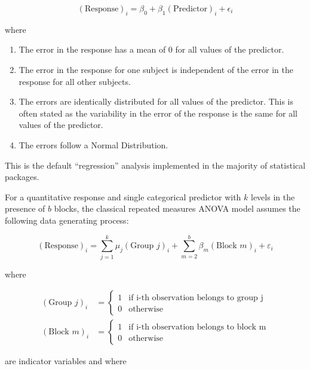 \documentclass[
  letterpaper,
  DIV=11,
  numbers=noendperiod]{scrreprt}
\providecommand{\tightlist}{%
  \setlength{\itemsep}{0pt}\setlength{\parskip}{0pt}}\usepackage{longtable,booktabs,array}
\theoremstyle{definition}
\theoremstyle{definition}
\theoremstyle{plain}
\theoremstyle{remark}
\begin{document}
\[(\text{Response})_i = \beta_0 + \beta_1 (\text{Predictor})_{i} + \epsilon_i\]

where

\begin{enumerate}
\def\labelenumi{\arabic{enumi}.}
\tightlist
\item
  The error in the response has a mean of 0 for all values of the
  predictor.
\item
  The error in the response for one subject is independent of the error
  in the response for all other subjects.
\item
  The errors are identically distributed for all values of the
  predictor. This is often stated as the variability in the error of the
  response is the same for all values of the predictor.
\item
  The errors follow a Normal Distribution.
\end{enumerate}

This is the default ``regression'' analysis implemented in the majority
of statistical packages.

\begin{description}
\tightlist
\item[Classical Repeated Measures ANOVA Model
(Definition~\ref{def-classical-repeated-measures-anova})]
For a quantitative response and single categorical predictor with \(k\)
levels in the presence of \(b\) blocks, the classical repeated measures
ANOVA model assumes the following data generating process:
\end{description}

\[(\text{Response})_i = \sum_{j=1}^{k} \mu_j (\text{Group } j)_i + \sum_{m=2}^{b} \beta_m (\text{Block } m)_i + \varepsilon_i\]

where

\[
\begin{aligned}
  (\text{Group } j)_{i} &= \begin{cases}
    1 & \text{if i-th observation belongs to group j} \\
    0 & \text{otherwise}
    \end{cases} \\
  (\text{Block } m)_{i} &= \begin{cases}
    1 & \text{if i-th observation belongs to block m} \\
    0 & \text{otherwise}
    \end{cases}
\end{aligned}
\]

are indicator variables and where
\end{document}

